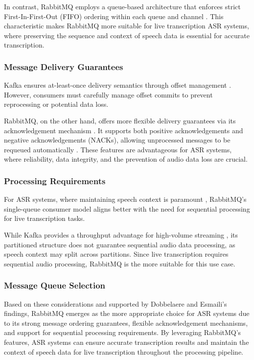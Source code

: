 In contrast, RabbitMQ employs a queue-based architecture that enforces strict First-In-First-Out (FIFO) ordering within each queue and channel \cite{kafka_v_rabbitmq}. This characteristic makes RabbitMQ more suitable for live transcription ASR systems, where preserving the sequence and context of speech data is essential for accurate transcription.

\subsubsection{Message Delivery Guarantees} Kafka ensures at-least-once delivery semantics through offset management \cite{kafka_v_rabbitmq}. However, consumers must carefully manage offset commits to prevent reprocessing or potential data loss.

RabbitMQ, on the other hand, offers more flexible delivery guarantees via its acknowledgement mechanism \cite{kafka_v_rabbitmq}. It supports both positive acknowledgements and negative acknowledgements (NACKs), allowing unprocessed messages to be requeued automatically \cite{rabbitmq_nack}. These features are advantageous for ASR systems, where reliability, data integrity, and the prevention of audio data loss are crucial.

\subsubsection{Processing Requirements}
For ASR systems, where maintaining speech context is paramount \cite{speech_context}, RabbitMQ's single-queue consumer model aligns better with the need for sequential processing for live transcription tasks.

While Kafka provides a throughput advantage for high-volume streaming \cite{kafka_v_rabbitmq}, its partitioned structure does not guarantee sequential audio data processing, as speech context may split across partitions. Since live transcription requires sequential audio processing, RabbitMQ is the more suitable for this use case.

\subsubsection{Message Queue Selection} \label{subsection:research_gap}
Based on these considerations and supported by Dobbelaere and Esmaili's \cite{kafka_v_rabbitmq} findings, RabbitMQ emerges as the more appropriate choice for ASR systems due to its strong message ordering guarantees, flexible acknowledgement mechanisms, and support for sequential processing requirements. By leveraging RabbitMQ's features, ASR systems can ensure accurate transcription results and maintain the context of speech data for live transcription throughout the processing pipeline.


